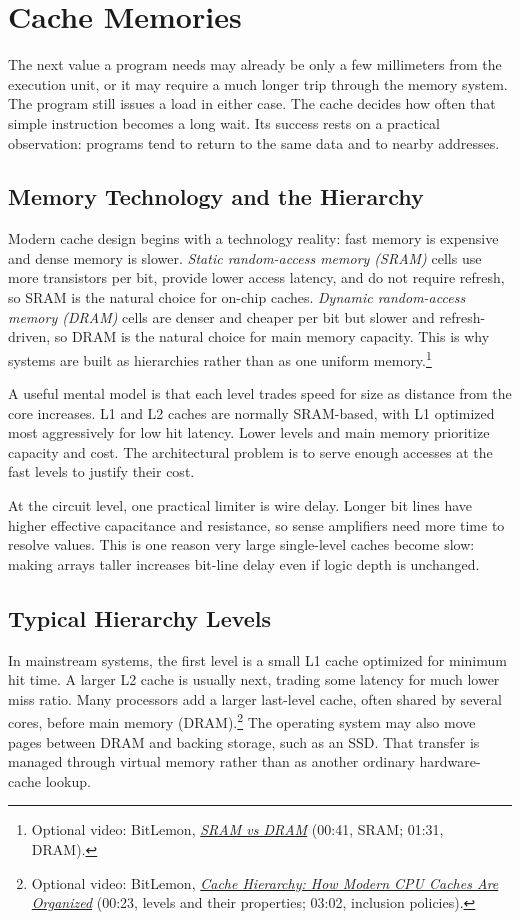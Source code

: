 \chapter{Cache Memories}\label{ch:auto-004}

The next value a program needs may already be only a few millimeters from the execution unit, or it may require a much longer trip through the memory system.
The program still issues a load in either case.
The cache decides how often that simple instruction becomes a long wait.
Its success rests on a practical observation: programs tend to return to the same data and to nearby addresses.


\section{Memory Technology and the Hierarchy}\label{sec:auto-019}
Modern cache design begins with a technology reality: fast memory is expensive and dense memory is slower.
\textit{Static random-access memory (SRAM)} cells use more transistors per bit, provide lower access latency, and do not require refresh, so SRAM is the natural choice for on-chip caches.
\textit{Dynamic random-access memory (DRAM)} cells are denser and cheaper per bit but slower and refresh-driven, so DRAM is the natural choice for main memory capacity.
This is why systems are built as hierarchies rather than as one uniform memory.\footnote{Optional video: BitLemon, \href{https://youtu.be/ammQYLcyebA?t=41}{\emph{SRAM vs DRAM}} (00:41, SRAM; 01:31, DRAM).}

A useful mental model is that each level trades speed for size as distance from the core increases.
L1 and L2 caches are normally SRAM-based, with L1 optimized most aggressively for low hit latency.
Lower levels and main memory prioritize capacity and cost.
The architectural problem is to serve enough accesses at the fast levels to justify their cost.

At the circuit level, one practical limiter is wire delay.
Longer bit lines have higher effective capacitance and resistance, so sense amplifiers need more time to resolve values.
This is one reason very large single-level caches become slow: making arrays taller increases bit-line delay even if logic depth is unchanged.


\section{Typical Hierarchy Levels}\label{sec:auto-020}
In mainstream systems, the first level is a small L1 cache optimized for minimum hit time.
A larger L2 cache is usually next, trading some latency for much lower miss ratio.
Many processors add a larger last-level cache, often shared by several cores, before main memory (DRAM).\footnote{Optional video: BitLemon, \href{https://youtu.be/7yrK_9PderQ?t=23}{\emph{Cache Hierarchy: How Modern CPU Caches Are Organized}} (00:23, levels and their properties; 03:02, inclusion policies).}
The operating system may also move pages between DRAM and backing storage, such as an SSD.
That transfer is managed through virtual memory rather than as another ordinary hardware-cache lookup.

